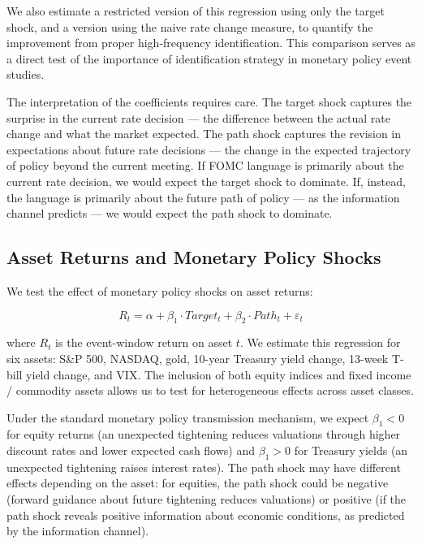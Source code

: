 \documentclass[12pt]{article}
\begin{document}
We also estimate a restricted version of this regression using only the target shock, and a version using the naive rate change measure, to quantify the improvement from proper high-frequency identification. This comparison serves as a direct test of the importance of identification strategy in monetary policy event studies.

The interpretation of the coefficients requires care. The target shock captures the surprise in the current rate decision --- the difference between the actual rate change and what the market expected. The path shock captures the revision in expectations about future rate decisions --- the change in the expected trajectory of policy beyond the current meeting. If FOMC language is primarily about the current rate decision, we would expect the target shock to dominate. If, instead, the language is primarily about the future path of policy --- as the information channel predicts --- we would expect the path shock to dominate.

\subsection{Asset Returns and Monetary Policy Shocks}

We test the effect of monetary policy shocks on asset returns:

\begin{equation*}
R_t = \alpha + \beta_1 \cdot Target_t + \beta_2 \cdot Path_t + \varepsilon_t
\end{equation*}

where $R_t$ is the event-window return on asset $t$. We estimate this regression for six assets: S\&P 500, NASDAQ, gold, 10-year Treasury yield change, 13-week T-bill yield change, and VIX. The inclusion of both equity indices and fixed income / commodity assets allows us to test for heterogeneous effects across asset classes.

Under the standard monetary policy transmission mechanism, we expect $\beta_1 < 0$ for equity returns (an unexpected tightening reduces valuations through higher discount rates and lower expected cash flows) and $\beta_1 > 0$ for Treasury yields (an unexpected tightening raises interest rates). The path shock may have different effects depending on the asset: for equities, the path shock could be negative (forward guidance about future tightening reduces valuations) or positive (if the path shock reveals positive information about economic conditions, as predicted by the information channel).
\end{document}
